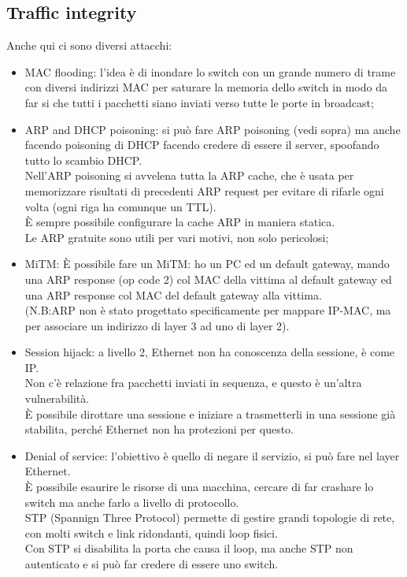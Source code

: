 \documentclass[12pt, oneside]{extbook} %
\begin{document}
\subsection{Traffic integrity}
Anche qui ci sono diversi attacchi:
\begin{itemize}
    \item MAC flooding: l'idea è di inondare lo switch con un grande numero di trame con diversi indirizzi MAC per saturare la memoria dello switch in modo da far si che tutti i pacchetti siano inviati verso tutte le porte in broadcast;
    \item ARP and DHCP poisoning: si può fare ARP poisoning (vedi sopra) ma anche facendo poisoning di DHCP facendo credere di essere il server, spoofando tutto lo scambio DHCP.
    \\Nell'ARP poisoning si avvelena tutta la ARP cache, che è usata per memorizzare risultati di precedenti ARP request per evitare di rifarle ogni volta (ogni riga ha comunque un TTL).
    \\È sempre possibile configurare la cache ARP in maniera statica.
    \\Le ARP gratuite sono utili per vari motivi, non solo pericolosi;
    \item MiTM: È possibile fare un MiTM: ho un PC ed un default gateway, mando una ARP response (op code 2) col MAC della vittima al default gateway ed una ARP response col MAC del default gateway alla vittima.
    \\(N.B:ARP non è stato progettato specificamente per mappare IP-MAC, ma per associare un indirizzo di layer 3 ad uno di layer 2).
    \item Session hijack: a livello 2, Ethernet non ha conoscenza della sessione, è come IP.
    \\Non c'è relazione fra pacchetti inviati in sequenza, e questo è un'altra vulnerabilità.
    \\È possibile dirottare una sessione e iniziare a trasmetterli in una sessione già stabilita, perché Ethernet non ha protezioni per questo.
    \item Denial of service: l'obiettivo è quello di negare il servizio, si può fare nel layer Ethernet.
    \\È possibile esaurire le risorse di una macchina, cercare di far crashare lo switch ma anche farlo a livello di protocollo.
    \\STP (Spannign Three Protocol) permette di gestire grandi topologie di rete, con molti switch e link ridondanti, quindi loop fisici.
    \\Con STP si disabilita la porta che causa il loop, ma anche STP non  autenticato e si può far credere di essere uno switch.
\end{itemize}
\end{document}
